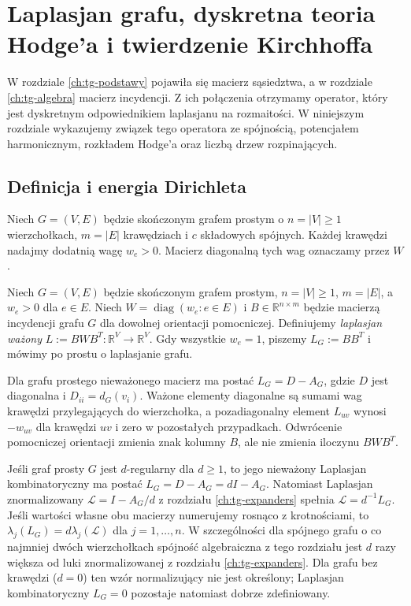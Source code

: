 \chapter{Laplasjan grafu, dyskretna teoria Hodge'a i twierdzenie Kirchhoffa}
\label{ch:tg-laplacian}

W rozdziale \ref{ch:tg-podstawy} pojawiła się macierz sąsiedztwa,
a w rozdziale \ref{ch:tg-algebra} macierz incydencji. Z ich połączenia otrzymamy operator, który
jest dyskretnym odpowiednikiem laplasjanu na rozmaitości.
W niniejszym rozdziale wykazujemy związek tego operatora
ze spójnością, potencjałem harmonicznym, rozkładem Hodge'a
oraz liczbą drzew rozpinających.

\section{Definicja i energia Dirichleta}
\label{sec:tg-lap-definition}

Niech $G=(V,E)$ będzie skończonym grafem prostym
o $n=|V|\geq1$ wierzchołkach, $m=|E|$ krawędziach
i $c$ składowych spójnych. Każdej krawędzi nadajmy dodatnią wagę $w_e>0$.
Macierz diagonalną tych wag oznaczamy przez $W$.

\begin{definicja}
Niech $G=(V,E)$ będzie skończonym grafem prostym,
$n=|V|\geq1$, $m=|E|$, a $w_e>0$ dla $e\in E$.
Niech $W=\operatorname{diag}(w_e:e\in E)$ i
$B\in\mathbb R^{n\times m}$ będzie macierzą incydencji
grafu $G$ dla dowolnej orientacji pomocniczej. Definiujemy
\emph{laplasjan ważony} $L:=BWB^T:\mathbb R^V\to\mathbb R^V$.
Gdy wszystkie $w_e=1$, piszemy $L_G:=BB^T$ i mówimy
po prostu o laplasjanie grafu.
\end{definicja}

Dla grafu prostego nieważonego macierz ma postać
$L_G=D-A_G$, gdzie $D$ jest diagonalna i $D_{ii}=d_G(v_i)$.
Ważone elementy diagonalne są sumami wag krawędzi
przylegających do wierzchołka, a pozadiagonalny element
$L_{uv}$ wynosi $-w_{uv}$ dla krawędzi $uv$ i zero w pozostałych
przypadkach. Odwrócenie pomocniczej orientacji zmienia znak
kolumny $B$, ale nie zmienia iloczynu $BWB^T$.

\begin{uwaga}
\label{rem:tg-laplacian-conventions}
Jeśli graf prosty $G$ jest $d$-regularny dla $d\geq1$,
to jego nieważony Laplasjan kombinatoryczny ma postać
$L_G=D-A_G=dI-A_G$. Natomiast Laplasjan znormalizowany
$\mathcal L=I-A_G/d$ z rozdziału \ref{ch:tg-expanders}
spełnia $\mathcal L=d^{-1}L_G$. Jeśli wartości własne obu macierzy numerujemy rosnąco
z krotnościami, to $\lambda_j(L_G)=d\lambda_j(\mathcal L)$
dla $j=1,\ldots,n$. W szczególności dla spójnego grafu o co najmniej
dwóch wierzchołkach spójność algebraiczna
z tego rozdziału jest $d$ razy większa od luki
znormalizowanej z rozdziału \ref{ch:tg-expanders}.
Dla grafu bez krawędzi ($d=0$) ten wzór normalizujący
nie jest określony; Laplasjan kombinatoryczny
$L_G=0$ pozostaje natomiast dobrze zdefiniowany.
\end{uwaga}

